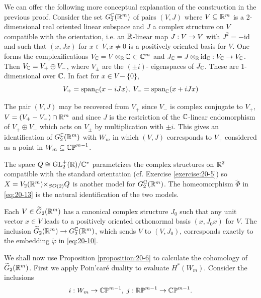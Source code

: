 \begin{remark}\label{remark:20-7}
  We can offer the following more conceptual explanation of the construction in the previous proof. 
  Consider the set ${G}_{2}^{\mathbb{C}}( {{\mathbb{R}}^m})$ of pairs $(V, J)$ where $V \subseteq  {{\ensuremath{\mathbb{R}}}^m}$ is a 2-dimensional 
  real oriented linear subspace and $J$ a complex structure on $V$ compatible with the orientation, i.e. 
  an $\mathbb{R}$-linear map $J:V \rightarrow V$ with ${J}^{2} = - \mathrm{{id}}$ and such that $(x, Jx)$ for $x \in  V,x \neq  0$ 
  is a positively oriented basis for $V$. One forms the complexifications ${V}_{\mathbb{C}} = V\,{ \otimes  }_{\mathbb{R}}\,\mathbb{C} 
  \subset  {\ensuremath{\mathbb{C}}}^{m}$ and ${J}_{\mathbb{C}} = J\,{ \otimes  }_{\mathbb{R}}\,{\mathrm{id}}_{\mathbb{C}} : {V}_{\mathbb{C}} \rightarrow  {V}_{\mathbb{C}}$. 
  Then ${V}_{\mathbb{C}} = {V}_{ + } \oplus  {V}_{- }$, where ${V}_{ \pm  }$ are the $( {\pm i})$- eigenspaces of ${J}_{\mathbb{C}}$. 
  These are 1-dimensional over $\mathbb{C}$. In fact for $x \in  V- \{ 0\}$,
  \[
    {V}_{ + } = {\mathrm{span}}_{\mathbb{C}}( {x- {iJx}}),\;{V}_{- } = {\mathrm{span}}_{\mathbb{C}}( {x + {iJx}})
  \]
  
  The pair $(V, J)$ may be recovered from ${V}_{ + }$ since ${V}_{- }$ is complex conjugate to $V_+$, $V= (V_+-V_{-})\cap {\ensuremath{\mathbb{R}}}^m$ 
  and since $J$ is the restriction of the $\mathbb{C}$-linear endomorphism of ${V}_{ + } \oplus  {V}_{- }$ which acts on ${V}_{ \pm  }$ 
  by multiplication with $\pm  i$. This gives an identification of ${G}_{2}^{\mathbb{C}}( {{\mathbb{R}}^m})$ with ${W}_{m}$ in which $(V, J)$ 
  corresponds to ${V}_{ + }$ considered as a point in ${W}_{m}\subseteq {\mathbb{CP}}^{m-1}$.
  
  The space $Q \cong  {\ensuremath{\mathrm{GL}}_2^+}( \mathbb{R}) /{\mathbb{C}}^*$ parametrizes the complex structures on ${\mathbb{R}}^{2}$ 
  compatible with the standard orientation (cf. Exercise \ref{exercise:20-5}) so $X = {V}_{2}( {{\mathbb{R}}^m}) { \times  }_{{SO}( 2) }Q$ is 
  another model for ${G}_{2}^{\mathrm{C}}( {{\mathbb{R}}^m})$. The homeomorphism $\widetilde{\Phi }$ in \eqref{eq:20-13} is the natural 
  identification of the two models.
  
  Each $V \in  \widetilde{G}_{2}( {{\mathbb{R}}^m})$ has a canonical complex structure ${J}_{0}$ such that any unit 
  vector $x \in  V$ leads to a positively oriented orthonormal basis $( {x,{J}_{0}x})$ for $V$. The 
  inclusion $\widetilde{G}_{2}( {{\mathbb{R}}^m})  \rightarrow  {G}_{2}^{\mathbb{C}}( {{\mathbb{R}}^m})$, which sends $V$ to $( {V,{J}_{0}})$, 
  corresponds exactly to the embedding $\widetilde{\varphi }$ in \eqref{eq:20-10}.
\end{remark}


We shall now use Proposition \ref{proposition:20-6} to calculate the cohomology of $\widetilde{G}_{2}( {{\mathbb{R}}^m})$. 
First we apply Poin’caré duality to evaluate $H^*( {W}_{m})$. Consider the inclusions
\[
  i : {W}_{m} \rightarrow  {\mathbb{CP}}^{m- 1},\;j : \mathbb{RP}^{m- 1} \rightarrow \mathbb{CP}^{m- 1}.
\]

